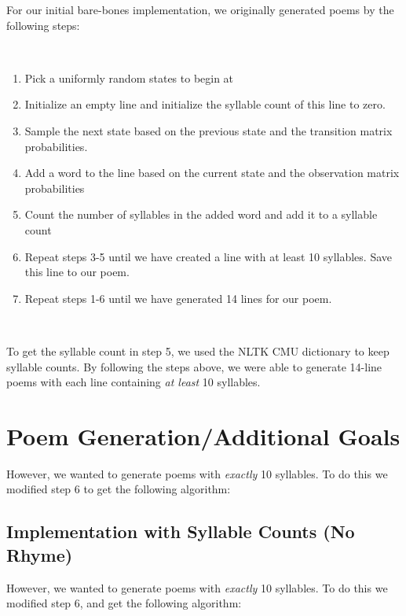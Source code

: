 For our initial bare-bones implementation, we originally generated poems by the following steps:

~

\begin{enumerate}

\item Pick a uniformly random states to begin at

\item Initialize an empty line and initialize the syllable count of this line to zero.

\item Sample the next state based on the previous state and the transition matrix probabilities.

\item Add a word to the line based on the current state and the observation matrix probabilities

\item Count the number of syllables in the added word and add it to a syllable count

\item Repeat steps 3-5 until we have created a line with at least 10 syllables. Save this line to our poem.

\item Repeat steps 1-6 until we have generated 14 lines for our poem.

\end{enumerate}
~

To get the syllable count in step 5, we used the NLTK CMU dictionary to keep syllable counts. By following the steps above, we were able to generate 14-line poems with each line containing \textit{at least} 10 syllables. 

\section{Poem Generation/Additional Goals}

However, we wanted to generate poems with \textit{exactly} 10 syllables. To do this we modified step 6 to get the following algorithm:

\subsection*{Implementation with Syllable Counts (No Rhyme)}

However, we wanted to generate poems with \textit{exactly} 10 syllables. To do this we modified step 6, and get the following algorithm:

